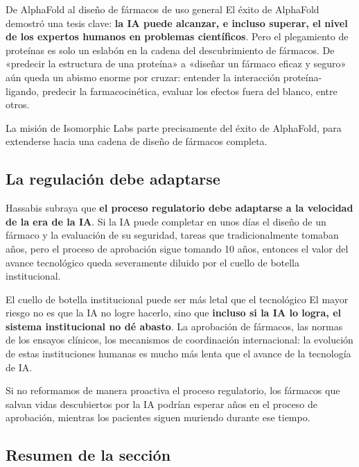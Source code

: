 \documentclass[a4paper]{article}
\begin{document}
\begin{knowledgebox}{De AlphaFold al diseño de fármacos de uso general}
El éxito de AlphaFold demostró una tesis clave: \textbf{la IA puede alcanzar, e incluso superar, el nivel de los expertos humanos en problemas científicos}. Pero el plegamiento de proteínas es solo un eslabón en la cadena del descubrimiento de fármacos. De «predecir la estructura de una proteína» a «diseñar un fármaco eficaz y seguro» aún queda un abismo enorme por cruzar: entender la interacción proteína-ligando, predecir la farmacocinética, evaluar los efectos fuera del blanco, entre otros.

La misión de Isomorphic Labs parte precisamente del éxito de AlphaFold, para extenderse hacia una cadena de diseño de fármacos completa.
\end{knowledgebox}

\subsection{La regulación debe adaptarse}

Hassabis subraya que \textbf{el proceso regulatorio debe adaptarse a la velocidad de la era de la IA}. Si la IA puede completar en unos días el diseño de un fármaco y la evaluación de su seguridad, tareas que tradicionalmente tomaban años, pero el proceso de aprobación sigue tomando 10 años, entonces el valor del avance tecnológico queda severamente diluido por el cuello de botella institucional.

\begin{warningbox}{El cuello de botella institucional puede ser más letal que el tecnológico}
El mayor riesgo no es que la IA no logre hacerlo, sino que \textbf{incluso si la IA lo logra, el sistema institucional no dé abasto}. La aprobación de fármacos, las normas de los ensayos clínicos, los mecanismos de coordinación internacional: la evolución de estas instituciones humanas es mucho más lenta que el avance de la tecnología de IA.

Si no reformamos de manera proactiva el proceso regulatorio, los fármacos que salvan vidas descubiertos por la IA podrían esperar años en el proceso de aprobación, mientras los pacientes siguen muriendo durante ese tiempo.
\end{warningbox}

\subsection{Resumen de la sección}
\end{document}
